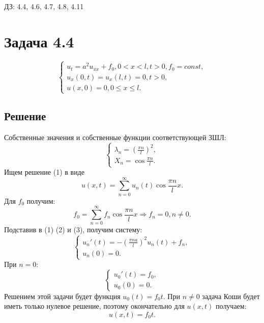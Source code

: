 \documentclass[11pt]{article}
\author{Sergey Makarov}
\date{\today}
\title{}
\def\zall{\setcounter{lem}{0}\setcounter{cnsqnc}{0}\setcounter{th}{0}\setcounter{Cmt}{0}\setcounter{equation}{0}}
\begin{document}
\zall

ДЗ: 4.4, 4.6, 4.7, 4.8, 4.11

\section{Задача 4.4}
\label{sec:orgcd4397b}
\begin{equation}
\begin{cases}
u_t = a^2u_{xx} + f_0, 0 < x < l, t > 0, f_0 = const, \\
u_x(0, t) = u_x(l, t) = 0, t > 0, \\
u(x, 0) = 0, 0 \leq x \leq l.
\end{cases}
\end{equation}
\subsection{Решение}
\label{sec:org68ccd06}
Собственные значения и собственные функции соответствующей ЗШЛ:
\begin{equation*}
\begin{cases}
\lambda_n = \left(\frac{\pi n}l\right)^2, \\
X_n = \cos\frac{\pi n}l.
\end{cases}
\end{equation*}
Ищем решение (1) в виде
\begin{equation}
u(x, t) = \sum_{n = 0}^{\infty}u_n(t)\cos\frac{\pi n}lx.
\end{equation}
Для $f_0$ получим:
\begin{equation}
f_0 = \sum_{n = 0}^{\infty}f_n\cos\frac{\pi n}lx \Rightarrow f_n = 0, n \neq 0.
\end{equation}
Подставив в (1) (2) и (3), получим систему:
\begin{equation*}
\begin{cases}
u_n'(t) = -\left(\frac{\pi na}l\right)^2u_n(t) + f_n, \\
u_n(0) = 0.
\end{cases}
\end{equation*}
При $n = 0$:
\begin{equation*}
\begin{cases}
u_0'(t) = f_0, \\
u_0(0) = 0.
\end{cases}
\end{equation*}
Решением этой задачи будет функция $u_0(t) = f_0t$.
При $n \neq 0$ задача Коши будет иметь только нулевое решение, поэтому окончательно для $u(x, t)$ получаем:
\begin{equation}
u(x, t) = f_0t.
\end{equation}
\end{document}
